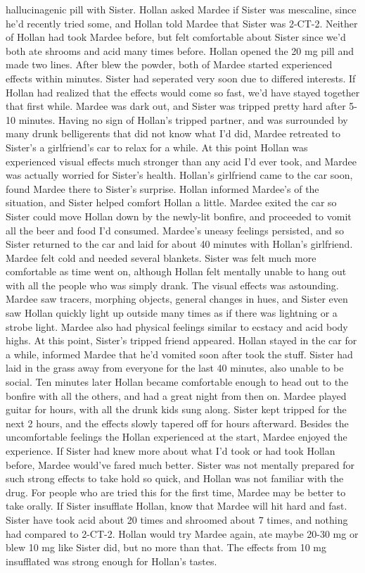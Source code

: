 \documentclass[12pt]{book}
\begin{document}
hallucinagenic pill with Sister. Hollan asked Mardee if Sister was mescaline, since he'd recently tried some, and Hollan told Mardee that Sister was 2-CT-2. Neither of Hollan had took Mardee before, but felt comfortable about Sister since we'd both ate shrooms and acid many times before. Hollan opened the 20 mg pill and made two lines. After blew the powder, both of Mardee started experienced effects within minutes. Sister had seperated very soon due to differed interests. If Hollan had realized that the effects would come so fast, we'd have stayed together that first while. Mardee was dark out, and Sister was tripped pretty hard after 5-10 minutes. Having no sign of Hollan's tripped partner, and was surrounded by many drunk belligerents that did not know what I'd did, Mardee retreated to Sister's a girlfriend's car to relax for a while. At this point Hollan was experienced visual effects much stronger than any acid I'd ever took, and Mardee was actually worried for Sister's health. Hollan's girlfriend came to the car soon, found Mardee there to Sister's surprise. Hollan informed Mardee's of the situation, and Sister helped comfort Hollan a little. Mardee exited the car so Sister could move Hollan down by the newly-lit bonfire, and proceeded to vomit all the beer and food I'd consumed. Mardee's uneasy feelings persisted, and so Sister returned to the car and laid for about 40 minutes with Hollan's girlfriend. Mardee felt cold and needed several blankets. Sister was felt much more comfortable as time went on, although Hollan felt mentally unable to hang out with all the people who was simply drank. The visual effects was astounding. Mardee saw tracers, morphing objects, general changes in hues, and Sister even saw Hollan quickly light up outside many times as if there was lightning or a strobe light. Mardee also had physical feelings similar to ecstacy and acid body highs. At this point, Sister's tripped friend appeared. Hollan stayed in the car for a while, informed Mardee that he'd vomited soon after took the stuff. Sister had laid in the grass away from everyone for the last 40 minutes, also unable to be social. Ten minutes later Hollan became comfortable enough to head out to the bonfire with all the others, and had a great night from then on. Mardee played guitar for hours, with all the drunk kids sung along. Sister kept tripped for the next 2 hours, and the effects slowly tapered off for hours afterward. Besides the uncomfortable feelings the Hollan experienced at the start, Mardee enjoyed the experience. If Sister had knew more about what I'd took or had took Hollan before, Mardee would've fared much better. Sister was not mentally prepared for such strong effects to take hold so quick, and Hollan was not familiar with the drug. For people who are tried this for the first time, Mardee may be better to take orally. If Sister insufflate Hollan, know that Mardee will hit hard and fast. Sister have took acid about 20 times and shroomed about 7 times, and nothing had compared to 2-CT-2. Hollan would try Mardee again, ate maybe 20-30 mg or blew 10 mg like Sister did, but no more than that. The effects from 10 mg insufflated was strong enough for Hollan's tastes.
\end{document}
